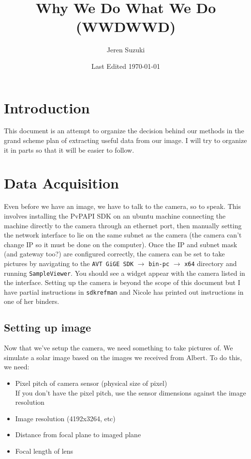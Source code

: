 \documentclass[10pt]{scrartcl}
\title{Why We Do What We Do (WWDWWD)}
\author{Jeren Suzuki}
\date{Last Edited \today}
\begin{document}
\maketitle
{}
\tableofcontents
{}
\clearpage
{}

\section*{Introduction} %
\label{sec:introduction}
\indent This document is an attempt to organize the decision behind our methods in the grand scheme plan of extracting useful data from our image. I will try to organize it in parts so that it will be easier to follow.

\section{Data Acquisition} %
\label{sec:data_acquisition}
Even before we have an image, we have to talk to the camera, so to speak. This involves installing the PvPAPI SDK on an ubuntu machine connecting the machine directly to the camera through an ethernet port, then manually setting the network interface to lie on the same subnet as the camera (the camera can't change IP so it must be done on the computer). Once the IP and subnet mask (and gateway too?) are configured correctly, the camera can be set to take pictures by navigating to the \texttt{AVT GiGE SDK} $\rightarrow$ \texttt{bin-pc} $\rightarrow$ \texttt{x64} directory and running \texttt{SampleViewer}. You should see a widget appear with the camera listed in the interface. Setting up the camera is beyond the scope of this document but I have partial instructions in \texttt{sdkrefman} and Nicole has printed out instructions in one of her binders. 

\subsection{Setting up image} %
\label{sub:setting_up_image}

Now that we've setup the camera, we need something to take pictures of. We simulate a solar image based on the images we received from Albert. To do this, we need:

\begin{itemize}
    \item Pixel pitch of camera sensor (physical size of pixel)\\   
        If you don't have the pixel pitch, use the sensor dimensions against the image resolution
    \item Image resolution (4192x3264, etc)
    \item Distance from focal plane to imaged plane
    \item Focal length of lens
\end{itemize}
\end{document}
